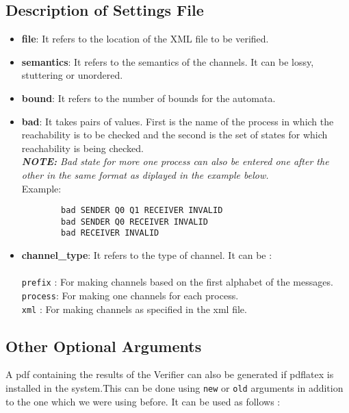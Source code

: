 \documentclass[a4paper]{article}
\begin{document}
\subsection{Description of Settings File}
\begin{itemize}
\item {\bf file}: It refers to the location of the XML file to be verified.

\item {\bf semantics}: It refers to the semantics of the channels. It can be lossy, stuttering or unordered.

\item {\bf bound}: It refers to the number of bounds for the automata.

\item {\bf bad}: It takes pairs of values. First is the name of the process in which the reachability is to be checked and the second is the  set of states for which reachability is being checked.\\
\emph{{\bf NOTE: }Bad state for more one process can also be entered one after the other in the same format as diplayed in the example below.}\\

Example:
\begin{verbatim}
        bad SENDER Q0 Q1 RECEIVER INVALID
        bad SENDER Q0 RECEIVER INVALID
        bad RECEIVER INVALID
\end{verbatim}

\item {\bf channel\_type}: It refers to the type of channel. It can be :\\\\
{\tt prefix} : For making channels based on the first alphabet of the messages.\\
{\tt process}: For making one channels for each process.\\
{\tt xml} : For making channels as specified in the xml file.

\end{itemize}

\subsection{Other Optional Arguments}
\def\verbatim@font{\normalfont\ttfamily}

A pdf containing the results of the Verifier can also be generated if pdflatex is 
installed in the system.This can be done using {\tt new} or {\tt old} arguments in addition to the one which we were using before. It can be used as follows :\\
\end{document}
